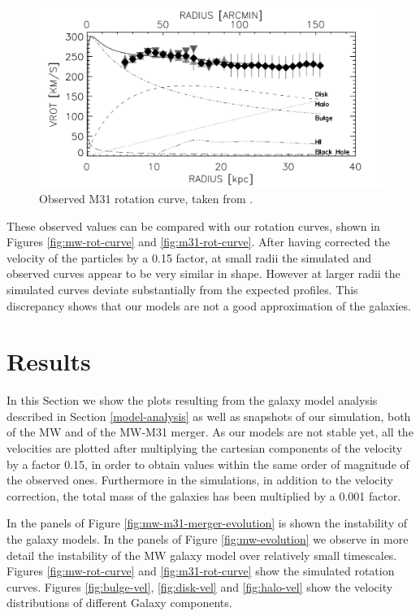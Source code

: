 \documentclass[a4paper,12pt, english]{article}
\begin{document}
\begin{figure}[t]
    \centering
    \includegraphics[width=0.8\linewidth]{observed_m31_rot_curve.png}
    \caption{Observed M31 rotation curve, taken from \textcite{Carignan_2006}.}
    \label{fig:obs-m31-curve}
\end{figure}

\smallskip
These observed values can be compared with our rotation curves, shown in Figures \ref{fig:mw-rot-curve} and \ref{fig:m31-rot-curve}. After having corrected the velocity of the particles by a 0.15 factor, at small radii the simulated and observed curves appear to be very similar in shape. However at larger radii the simulated curves deviate substantially from the expected profiles. This discrepancy shows that our models are not a good approximation of the galaxies.\par
\clearpage

\section{Results}
\label{resutls}
In this Section we show the plots resulting from the galaxy model analysis described in Section \ref{model-analysis} as well as snapshots of our simulation, both of the MW and of the MW-M31 merger. As our models are not stable yet, all the velocities are plotted after multiplying the cartesian components of the velocity by a factor 0.15, in order to obtain values within the same order of magnitude of the observed ones. Furthermore in the simulations, in addition to the velocity correction, the total mass of the galaxies has been multiplied by a 0.001 factor.\par
\smallskip
In the panels of Figure \ref{fig:mw-m31-merger-evolution} is shown the instability of the galaxy models. In the panels of Figure \ref{fig:mw-evolution} we observe in more detail the instability of the MW galaxy model over relatively small timescales. Figures \ref{fig:mw-rot-curve} and \ref{fig:m31-rot-curve} show the simulated rotation curves. Figures \ref{fig:bulge-vel}, \ref{fig:disk-vel} and \ref{fig:halo-vel} show the velocity distributions of different Galaxy components.\par
\end{document}
